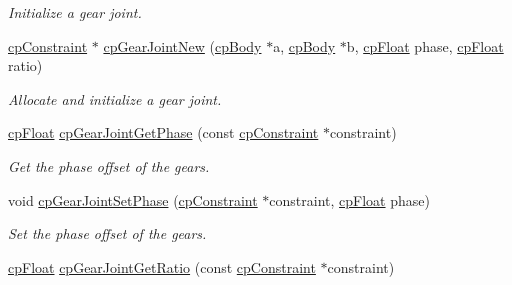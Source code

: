 \begin{DoxyCompactItemize}
\begin{DoxyCompactList}\small\item\em Initialize a gear joint. \end{DoxyCompactList}\item 
\hypertarget{group__cp_gear_joint_ga4e2d47ad6065e8449636509835e959fa}{}\hyperlink{structcp_constraint}{cp\+Constraint} $\ast$ \hyperlink{group__cp_gear_joint_ga4e2d47ad6065e8449636509835e959fa}{cp\+Gear\+Joint\+New} (\hyperlink{structcp_body}{cp\+Body} $\ast$a, \hyperlink{structcp_body}{cp\+Body} $\ast$b, \hyperlink{group__basic_types_gac1ed65573e035bf892505768c852d8d3}{cp\+Float} phase, \hyperlink{group__basic_types_gac1ed65573e035bf892505768c852d8d3}{cp\+Float} ratio)\label{group__cp_gear_joint_ga4e2d47ad6065e8449636509835e959fa}

\begin{DoxyCompactList}\small\item\em Allocate and initialize a gear joint. \end{DoxyCompactList}\item 
\hypertarget{group__cp_gear_joint_ga3405398a454e1084ecc67d89fd7080d7}{}\hyperlink{group__basic_types_gac1ed65573e035bf892505768c852d8d3}{cp\+Float} \hyperlink{group__cp_gear_joint_ga3405398a454e1084ecc67d89fd7080d7}{cp\+Gear\+Joint\+Get\+Phase} (const \hyperlink{structcp_constraint}{cp\+Constraint} $\ast$constraint)\label{group__cp_gear_joint_ga3405398a454e1084ecc67d89fd7080d7}

\begin{DoxyCompactList}\small\item\em Get the phase offset of the gears. \end{DoxyCompactList}\item 
\hypertarget{group__cp_gear_joint_ga85cade41c4a37f876c4a9a054dc012c8}{}void \hyperlink{group__cp_gear_joint_ga85cade41c4a37f876c4a9a054dc012c8}{cp\+Gear\+Joint\+Set\+Phase} (\hyperlink{structcp_constraint}{cp\+Constraint} $\ast$constraint, \hyperlink{group__basic_types_gac1ed65573e035bf892505768c852d8d3}{cp\+Float} phase)\label{group__cp_gear_joint_ga85cade41c4a37f876c4a9a054dc012c8}

\begin{DoxyCompactList}\small\item\em Set the phase offset of the gears. \end{DoxyCompactList}\item 
\hypertarget{group__cp_gear_joint_ga313d9eda8a1b11fa0131a566313920b4}{}\hyperlink{group__basic_types_gac1ed65573e035bf892505768c852d8d3}{cp\+Float} \hyperlink{group__cp_gear_joint_ga313d9eda8a1b11fa0131a566313920b4}{cp\+Gear\+Joint\+Get\+Ratio} (const \hyperlink{structcp_constraint}{cp\+Constraint} $\ast$constraint)\label{group__cp_gear_joint_ga313d9eda8a1b11fa0131a566313920b4}


\end{DoxyCompactItemize}
